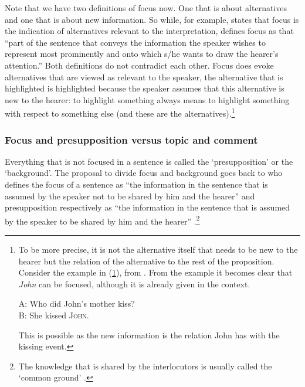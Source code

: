 Note that we have two definitions of focus now. One that is about alternatives and one that is about new information. So while, for example, \citet[18]{krifka2007basic} states that focus is the indication of alternatives relevant to the interpretation, \citet[1876]{hinterwimmer2011formation} defines focus as that ``part of the sentence that conveys the information the speaker wishes to represent most prominently and onto which s/he wants to draw the hearer's attention.'' Both definitions do not contradict each other. Focus does evoke alternatives that are viewed as relevant to the speaker, the alternative that is highlighted is highlighted because the speaker assumes that this alternative is new to the hearer: to highlight something always means to highlight something with respect to something else (and these are the alternatives).\footnote{ To be more precise, it is not the alternative itself that needs to be new to the hearer but the relation of the alternative to the rest of the proposition. Consider the example in (\ref{kissmotherrelation}), from \citet[55]{rochemont2016givenness}. From the example it becomes clear that \textit{John} can be focused, although it is already given in the context.

\begin{exe}
\ex A: Who did John's mother kiss? \\
B: She kissed \textsc{John}. \label{kissmotherrelation}
\end{exe}

\noindent This is possible as the new information is the relation John has with the kissing event.

}

\subsubsection{Focus and presupposition versus topic and comment}
Everything that is not focused in a sentence is called the `presupposition' or the `background'. The proposal to divide focus and background goes back to \citet{jackendoff1972semantic} who defines the focus of a sentence as ``the information in the sentence that is assumed by the speaker not to be shared by him and the hearer'' and presupposition respectively as ``the information in the sentence that is assumed by the speaker to be shared by him and the hearer'' \citep[230]{jackendoff1972semantic}.\footnote{ The knowledge that is shared by the interlocutors is usually called the `common ground' \citep{stalnaker1978assertion}.}

